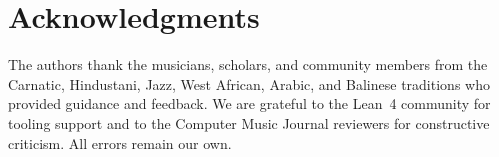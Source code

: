 \documentclass[cmj]{article}
\begin{document}
\section*{Acknowledgments}

The authors thank the musicians, scholars, and community members from the
Carnatic, Hindustani, Jazz, West African, Arabic, and Balinese traditions who
provided guidance and feedback. We are grateful to the Lean~4 community for
tooling support and to the Computer Music Journal reviewers for constructive
criticism. All errors remain our own.


\end{document}
